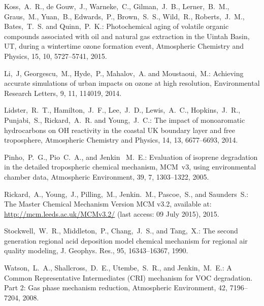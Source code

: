 \documentclass{article}
\begin{document}
\begin{thebibliography}{17}
     Koss,~A.~R., de Gouw,~J., Warneke,~C., Gilman,~J.~B., Lerner,~B.~M., Graus,~M., Yuan,~B., Edwards,~P., Brown,~S.~S., Wild,~R., Roberts,~J.~M., Bates,~T.~S. and Quinn,~P.~K.: {Photochemical aging of volatile organic compounds associated with oil and natural gas extraction in the Uintah Basin, UT, during a wintertime ozone formation event}, Atmospheric Chemistry and Physics, 15, 10, 5727--5741, 2015.

    Li,~J, Georgescu,~M., Hyde,~P., Mahalov,~A. and Moustaoui,~M.: Achieving accurate simulations of urban impacts on ozone at high resolution, Environmental Research Letters, 9, 11, 114019, 2014.

   Lidster,~R.~T., Hamilton,~J.~F., Lee,~J.~D., Lewis,~A.~C., Hopkins,~J.~R., Punjabi,~S., Rickard,~A.~R. and Young,~J.~C.: The impact of monoaromatic hydrocarbons on OH reactivity in the coastal UK boundary layer and free troposphere, Atmospheric Chemistry and Physics, 14, 13, 6677--6693, 2014.

     Pinho,~P.~G., Pio~C.~A., and Jenkin~ M.~E.: Evaluation of isoprene degradation in the detailed tropospheric chemical mechanism, MCM~v3, using environmental chamber data, Atmospheric Environment, 39, 7, 1303--1322, 2005.

     Rickard,~A., Young,~J., Pilling,~M., Jenkin.~M., Pascoe,~S., and Saunders~S.: {The Master Chemical Mechanism Version MCM v3.2}, available at: \url{http://mcm.leeds.ac.uk/MCMv3.2/} (last access: 09 July 2015), 2015.

     Stockwell,~W.~R., Middleton,~P., Chang,~J.~S., and Tang,~X.: {The second generation regional acid deposition model chemical mechanism for regional air quality modeling}, J. Geophys. Res., 95, 16343--16367, 1990.

     Watson,~L.~A., Shallcross,~D.~E., Utembe,~S.~R., and Jenkin,~M.~E.: A Common Representative Intermediates (CRI) mechanism for VOC degradation. Part 2: Gas phase mechanism reduction, Atmospheric Environment, 42, 7196--7204, 2008.

\end{thebibliography}
\end{document}
